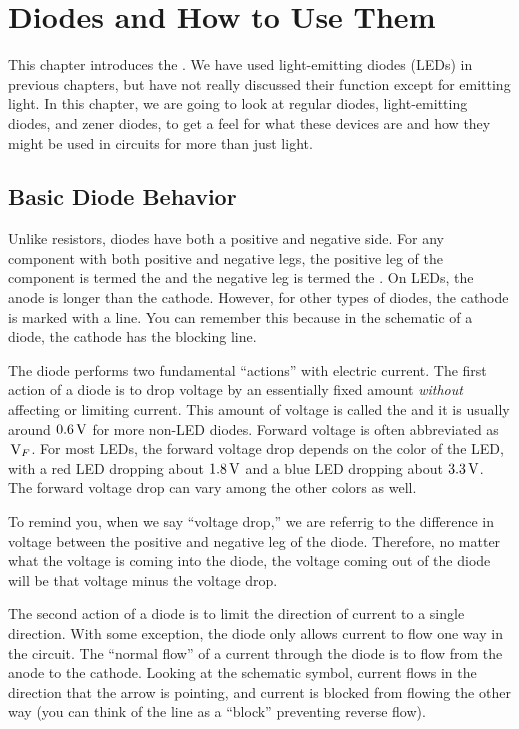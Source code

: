 \chapter{Diodes and How to Use Them}

This chapter introduces the .  
We have used light-emitting diodes (LEDs) in previous chapters, but have not really discussed their function except for emitting light.
In this chapter, we are going to look at regular diodes, light-emitting diodes, and zener diodes, to get a feel for what these devices are and how they might be used in circuits for more than just light.


\section{Basic Diode Behavior}

Unlike resistors, diodes have both a positive and negative side.
For any component with both positive and negative legs, the positive leg of the component is termed the  and the negative leg is termed the .
On LEDs, the anode is longer than the cathode.
However, for other types of diodes, the cathode is marked with a line.
You can remember this because in the schematic of a diode, the cathode has the blocking line.

The diode performs two fundamental ``actions'' with electric current.  
The first action of a diode is to drop voltage by an essentially fixed amount \emph{without} affecting or limiting current.
This amount of voltage is called the  and it is usually around $0.6\,\si{\volt}$ for more non-LED diodes. 
Forward voltage is often abbreviated as $\,\si{\volt}_F$.
For most LEDs, the forward voltage drop depends on the color of the LED, with a red LED dropping about $1.8\,\si{\volt}$ and a blue LED dropping about $3.3\,\si{\volt}$.
The forward voltage drop can vary among the other colors as well.

To remind you, when we say ``voltage drop,'' we are referrig to the difference in voltage between the positive and negative leg of the diode.
Therefore, no matter what the voltage is coming into the diode, the voltage coming out of the diode will be that voltage minus the voltage drop.

The second action of a diode is to limit the direction of current to a single direction.
With some exception, the diode only allows current to flow one way in the circuit.
The ``normal flow'' of a current through the diode is to flow from the anode to the cathode.
Looking at the schematic symbol, current flows in the direction that the arrow is pointing, and current is blocked from flowing the other way (you can think of the line as a ``block'' preventing reverse flow).


